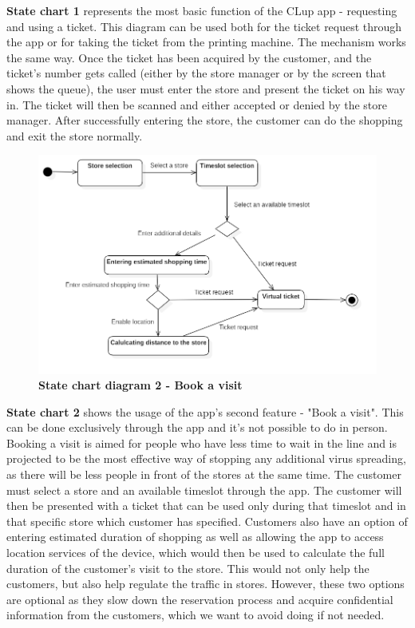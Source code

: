 \hspace{\parindent}\textbf{State chart 1} represents the most basic function of the CLup app - requesting and using a ticket. This diagram can be used both for the ticket request through the app or for taking the ticket from the printing machine. The mechanism works the same way. Once the ticket has been acquired by the customer, and the ticket's number gets called (either by the store manager or by the screen that shows the queue), the user must enter the store and present the ticket on his way in. The ticket will then be scanned and either accepted or denied by the store manager. After successfully entering the store, the customer can do the shopping and exit the store normally.  

\begin{figure}[!htb]
\centering
\includegraphics[width=\textwidth]{Images/StatechartDiagram2_BookAVisit}
\caption{\label{fig:statechart2}\textbf{State chart diagram 2 - Book a visit}}
\end{figure}
\newpage


\hspace{\parindent}\textbf{State chart 2} shows the usage of the app's second feature - "Book a visit". This can be done exclusively through the app and it's not possible to do in person. Booking a visit is aimed for people who have less time to wait in the line and is projected to be the most effective way of stopping any additional virus spreading, as there will be less people in front of the stores at the same time. The customer must select a store and an available timeslot through the app. The customer will then be presented with a ticket that can be used only during that timeslot and in that specific store which customer has specified. Customers also have an option of entering estimated duration of shopping as well as allowing the app to access location services of the device, which would then be used to calculate the full duration of the customer's visit to the store. This would not only help the customers, but also help regulate the traffic in stores. However, these two options are optional as they slow down the reservation process and acquire confidential information from the customers, which we want to avoid doing if not needed.

